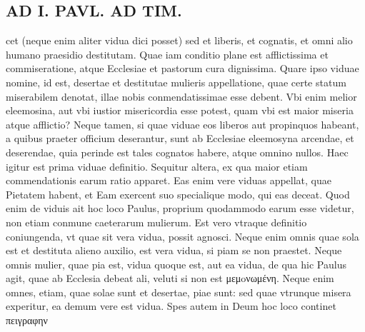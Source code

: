 \documentclass{article}
\begin{document}
\begin{pages}
\section*{AD I. PAVL. AD TIM. }
\marginpar{[ p.258 ]}\pstart cet (neque enim aliter vidua dici posset) sed et liberis, et cognatis, et omni alio humano praesidio destitutam. Quae iam conditio plane est afflictissima et commiseratione, atque Ecclesiae et pastorum cura dignissima. Quare ipso viduae nomine, id est, desertae et destitutae mulieris appellatione, quae certe statum miserabilem denotat, illae nobis conmendatissimae esse debent. Vbi enim melior eleemosina, aut vbi iustior misericordia esse potest, quam vbi est maior miseria atque afflictio? Neque tamen, si quae viduae eos liberos aut propinquos habeant, a quibus praeter officium deserantur, sunt ab Ecclesiae eleemosyna arcendae, et deserendae, quia perinde est tales cognatos habere, atque omnino nullos. Haec igitur est prima viduae definitio. Sequitur altera, ex qua maior etiam commendationis earum ratio apparet. Eas enim vere viduas appellat, quae Pietatem habent, et Eam exercent suo specialique modo, qui eas deceat. Quod enim de viduis ait hoc loco Paulus, proprium quodammodo earum esse videtur, non etiam conmune caeterarum mulierum. Est vero vtraque definitio coniungenda, vt quae sit vera vidua, possit agnosci. Neque enim omnis quae sola est et destituta alieno auxilio, est vera vidua, si piam se non praestet. Neque omnis mulier, quae pia est, vidua quoque est, aut ea vidua, de qua hic Paulus agit, quae ab Ecclesia debeat ali, veluti si non est μεμoνωμένη. Neque enim omnes, etiam, quae solae sunt et desertae, piae sunt: sed quae vtrunque misera experitur, ea demum vere est vidua. Spes autem in Deum hoc loco continet πειγραφην  \pend

\end{pages}
\end{document}
